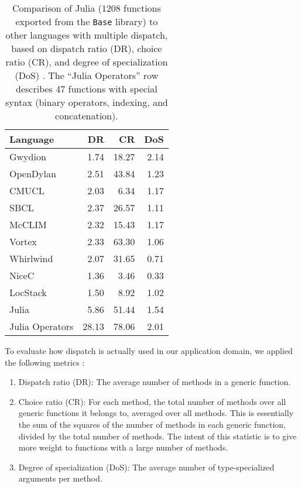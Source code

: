 \begin{table}[!t]
\begin{center}
\begin{tabular}{|l|r|r|r|}\hline
\textbf{Language} & \textbf{DR} & \textbf{CR} & \textbf{DoS} \\
\hline \hline
Gwydion    & 1.74 & 18.27 & 2.14 \\
\hline
OpenDylan  & 2.51 & 43.84 & 1.23 \\
\hline
CMUCL      & 2.03 &  6.34 & 1.17 \\
\hline
SBCL       & 2.37 & 26.57 & 1.11 \\
\hline
McCLIM     & 2.32 & 15.43 & 1.17 \\
\hline
Vortex     & 2.33 & 63.30 & 1.06 \\
\hline
Whirlwind  & 2.07 & 31.65 & 0.71 \\
\hline
NiceC      & 1.36 &  3.46 & 0.33 \\
\hline
LocStack   & 1.50 &  8.92 & 1.02 \\
\hline
Julia      & 5.86 & 51.44 & 1.54 \\
\hline
Julia Operators & 28.13 & 78.06 & 2.01 \\
\hline
\end{tabular}
\end{center}
\caption[Multiple dispatch use statistics]{
\small{
Comparison of Julia (1208 functions exported from the \texttt{Base} library)
to other languages with multiple dispatch, based on dispatch ratio (DR),
choice ratio (CR), and degree of specialization (DoS) \cite{multipledispatch}.
The ``Julia Operators'' row describes 47 functions with special syntax
(binary operators, indexing, and concatenation).
}
}
\label{dispatchratios}
\end{table}

To evaluate how dispatch is actually used in our application domain,
we applied the following metrics \cite{multipledispatch}:

\begin{enumerate}
\item Dispatch ratio (DR): The average number of methods in a generic function.
\item Choice ratio (CR): For each method, the total number of methods over all
generic functions it belongs to, averaged over all methods.
This is essentially the sum of the squares of the number of methods in each
generic function, divided by the total number of methods.
The intent of this statistic is to give more weight to functions with a large
number of methods.
\item Degree of specialization (DoS): The average number of type-specialized
arguments per method.
\end{enumerate}

